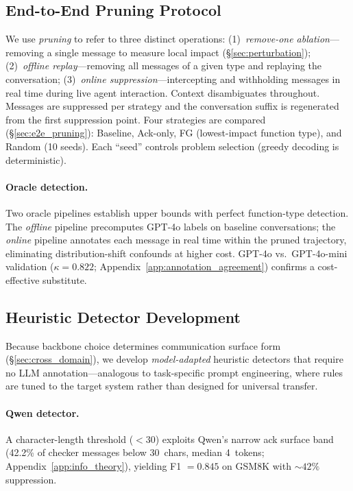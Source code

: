 \subsection{End-to-End Pruning Protocol}
\label{sec:pruning_protocol}

We use \emph{pruning} to refer to three distinct operations: (1)~\emph{remove-one ablation}---removing a single message to measure local impact (\S\ref{sec:perturbation}); (2)~\emph{offline replay}---removing all messages of a given type and replaying the conversation; (3)~\emph{online suppression}---intercepting and withholding messages in real time during live agent interaction. Context disambiguates throughout.
Messages are suppressed per strategy and the conversation suffix is regenerated from the first suppression point. Four strategies are compared (\S\ref{sec:e2e_pruning}): Baseline, Ack-only, FG (lowest-impact function type), and Random (10 seeds). Each ``seed'' controls problem selection (greedy decoding is deterministic).

\paragraph{Oracle detection.} Two oracle pipelines establish upper bounds with perfect function-type detection. The \emph{offline} pipeline precomputes GPT-4o labels on baseline conversations; the \emph{online} pipeline annotates each message in real time within the pruned trajectory, eliminating distribution-shift confounds at higher cost. GPT-4o vs.\ GPT-4o-mini validation ($\kappa = 0.822$; Appendix~\ref{app:annotation_agreement}) confirms a cost-effective substitute.

\subsection{Heuristic Detector Development}
\label{sec:heuristic}

Because backbone choice determines communication surface form (\S\ref{sec:cross_domain}), we develop \emph{model-adapted} heuristic detectors that require no LLM annotation---analogous to task-specific prompt engineering, where rules are tuned to the target system rather than designed for universal transfer.

\paragraph{Qwen detector.} A character-length threshold ($< 30$) exploits Qwen's narrow ack surface band (42.2\% of checker messages below 30~chars, median 4~tokens; Appendix~\ref{app:info_theory}), yielding F1 $= 0.845$ on GSM8K with ${\sim}42\%$ suppression.

